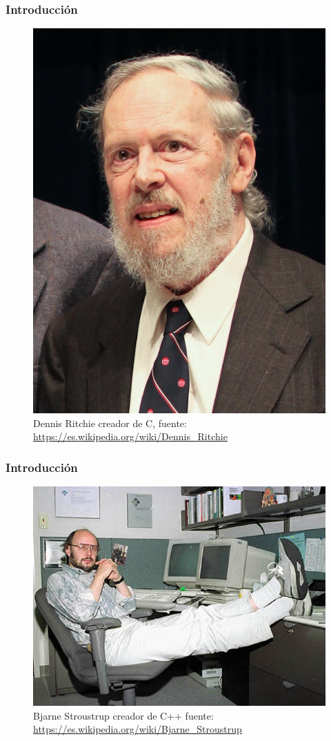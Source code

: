 \documentclass[xcolor=table]{beamer}
\begin{document}
\begin{frame}
\frametitle{Introducci\'on}    
\begin{figure}
    \centering
    \includegraphics{images/DennisRitchie.jpg}
    \caption{Dennis Ritchie creador de C, fuente: \url{https://es.wikipedia.org/wiki/Dennis_Ritchie}}
    \label{fig:critchie}
\end{figure}
\end{frame}

\begin{frame}
\frametitle{Introducci\'on} 
\begin{figure}
    \centering
    \includegraphics[scale=0.5]{images/BjarneStroustrup.jpg}
    \caption{Bjarne Stroustrup creador de C++ fuente: \url{https://es.wikipedia.org/wiki/Bjarne_Stroustrup}}
    \label{fig:cplusbjarne}
\end{figure}
\end{frame}
\end{document}
